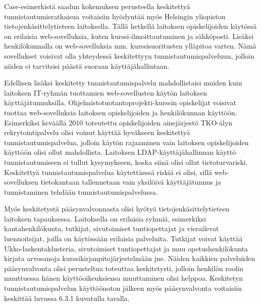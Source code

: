 Case-esimerkistä saadun kokemuksen perusteella keskitettyä tunnistautumisratkaisua voitaisiin hyödyntää myös Helsingin yliopiston tietojenkäsittelytieteen laitoksella. Tällä hetkellä laitoksen opiskelijoiden käytössä on erilaisia web-sovelluksia, kuten kurssi-ilmoittautuminen ja sähköposti. Lisäksi henkilökunnalla on web-sovelluksia mm. kurssisuoritusten ylläpitoa varten. Nämä sovellukset voisivat olla yhteydessä keskitettyyn tunnistautumispalveluun, jolloin niiden ei tarvitsisi päästä suoraan käyttäjähallintaan.

Edellisen lisäksi keskitetty tunnistautumispalvelu mahdollistaisi muiden kuin laitoksen IT-ryhmän tuottamien web-sovellusten käytön laitoksen käyttäjätunnuksilla. Ohjelmistotuotantoprojekti-kurssin opiskelijat voisivat tuottaa web-sovelluksia laitoksen opiskelijoiden ja henkilökunnan käyttöön. Esimerkiksi keväällä 2010 toteutettu opiskelijoiden ainejärjestö TKO-älyn rekrytointipalvelu olisi voinut käyttää hyväkseen keskitettyä tunnistautumispalvelua, jolloin käytön rajaaminen vain laitoksen opiskelijoiden käyttöön olisi ollut mahdollista. Laitoksen LDAP-käyt\-tä\-jä\-hal\-lin\-nan käyttö tunnistautumiseen ei tullut kysymykseen, koska siinä olisi ollut tietoturvariski. Keskitettyä tunnistautumispalvelua käytettäessä riskiä ei olisi, sillä web-sovelluksen tietokantaan tallennetaan vain yksilöivä käyttäjätunnus ja tunnistaminen tehdään tunnistautumispalvelussa.

Myös keskitetystä pääsynvalvonnasta olisi hyötyä tietojenkäsittelytieteen laitoksen tapauksessa. Laitoksella on erilaisia ryhmiä, esimerkiksi kantahenkilökunta, tutkijat, sivutoimiset tuntiopettajat ja vierailevat luennoitsijat, joilla on käytössään erilaisia palveluita. Tutkijat voivat käyttää Ukko-laskentaklusteria, sivutoimiset tuntiopettajat ja muu opetushenkilökunta kirjata arvosanoja kurssikirjanpitojärjestelmään jne. Näiden kaikkien palveluiden pääsynvalvonta olisi perusteltua toteuttaa keskitetysti, jolloin henkilön roolin muuttuessa hänen käyttöoikeuksiensa muuttaminen olisi helppoa. Keskitetyn tunnistautumispalvelun käyttöönoton jälkeen myös pääsynvalvonta voitaisiin keskittää luvussa 6.3.1 kuvatulla tavalla.